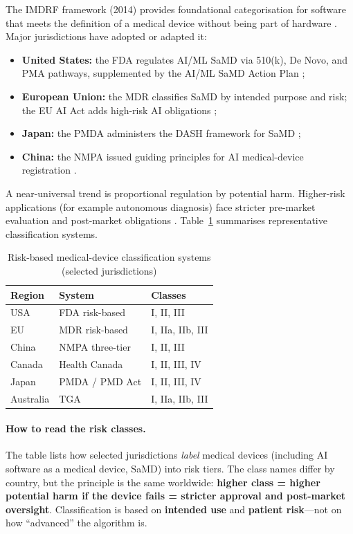 \documentclass[12pt,a4paper]{report}
\begin{document}
The IMDRF framework (2014) provides foundational categorisation for software that meets the definition of a medical device without being part of hardware \cite{imdrf2014}. Major jurisdictions have adopted or adapted it:
\begin{itemize}
  \item \textbf{United States:} the FDA regulates AI/ML SaMD via 510(k), De Novo, and PMA pathways, supplemented by the AI/ML SaMD Action Plan \cite{fda2021};
  \item \textbf{European Union:} the MDR classifies SaMD by intended purpose and risk; the EU AI Act adds high-risk AI obligations \cite{euaiact2024};
  \item \textbf{Japan:} the PMDA administers the DASH framework for SaMD \cite{pmda2020};
  \item \textbf{China:} the NMPA issued guiding principles for AI medical-device registration \cite{nmpa2021}.
\end{itemize}

A near-universal trend is proportional regulation by potential harm. Higher-risk applications (for example autonomous diagnosis) face stricter pre-market evaluation and post-market obligations \cite{muehlematter2021}. Table~\ref{tab:risk-systems} summarises representative classification systems.

\begin{table}[!htbp]
  \centering
  \caption[Risk-based device classification systems]{Risk-based medical-device classification systems (selected jurisdictions)}
  \label{tab:risk-systems}
  \begin{tabular}{@{}lll@{}}
    \toprule
    \textbf{Region} & \textbf{System} & \textbf{Classes} \\
    \midrule
    USA & FDA risk-based & I, II, III \\
    EU & MDR risk-based & I, IIa, IIb, III \\
    China & NMPA three-tier & I, II, III \\
    Canada & Health Canada & I, II, III, IV \\
    Japan & PMDA / PMD Act & I, II, III, IV \\
    Australia & TGA & I, IIa, IIb, III \\
    \bottomrule
  \end{tabular}
\end{table}

\paragraph{How to read the risk classes.}
The table lists how selected jurisdictions \emph{label} medical devices (including AI software as a medical device, SaMD) into risk tiers. The class names differ by country, but the principle is the same worldwide: \textbf{higher class = higher potential harm if the device fails = stricter approval and post-market oversight}. Classification is based on \textbf{intended use} and \textbf{patient risk}---not on how ``advanced'' the algorithm is.
\end{document}
